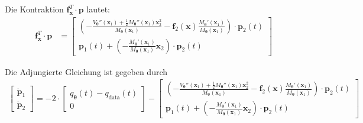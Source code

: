 \documentclass[a4paper, 12pt]{scrartcl}
\begin{document}
Die Kontraktion $\bm{f}_{\bm{x}}^T \cdot \bm{p}$ lautet:
\begin{align*}
    \bm{f}_{\bm{x}}^T \cdot \bm{p}
    &=
    \begin{bmatrix}
        \left(
            - \frac{V_{\bm{\theta}}''(\bm{x}_1) + \frac{1}{2} M_{\bm{\theta}}''(\bm{x}_1) \bm{x}_2^2}{M_{\bm{\theta}}(\bm{x}_1)}
            - \bm{f}_2(\bm{x}) \frac{M_{\bm{\theta}}'(\bm{x}_1)}{M_{\bm{\theta}}(\bm{x}_1)} 
        \right)
        \cdot 
        \bm{p}_2(t)
        \\
        \bm{p}_1(t) + 
        \left(
            - \frac{M_{\bm{\theta}}'(\bm{x}_1)}{M_{\bm{\theta}}(\bm{x}_1)} \bm{x}_2
        \right)
        \cdot 
        \bm{p}_2(t)
    \end{bmatrix}
\end{align*}

Die Adjungierte Gleichung ist gegeben durch
\begin{align*}
    \begin{bmatrix}
        \bm{\dot{p}}_1 \\
        \bm{\dot{p}}_2
    \end{bmatrix}
    =
    -2 \cdot
    \begin{bmatrix}
        q_{\bm{\theta}}(t) - q_{\text{data}}(t) \\
        0
    \end{bmatrix}
    -
    \begin{bmatrix}
        \left(
            - \frac{V_{\bm{\theta}}''(\bm{x}_1) + \frac{1}{2} M_{\bm{\theta}}''(\bm{x}_1) \bm{x}_2^2}{M_{\bm{\theta}}(\bm{x}_1)}
            - \bm{f}_2(\bm{x}) \frac{M_{\bm{\theta}}'(\bm{x}_1)}{M_{\bm{\theta}}(\bm{x}_1)} 
        \right)
        \cdot 
        \bm{p}_2(t)
        \\
        \bm{p}_1(t) + 
        \left(
            - 
            \frac{
                M_{\bm{\theta}}'(\bm{x}_1)
                }{
                    M_{\bm{\theta}}(\bm{x}_1)
                } \bm{x}_2
        \right)
        \cdot 
        \bm{p}_2(t)
    \end{bmatrix}
\end{align*}
\end{document}
